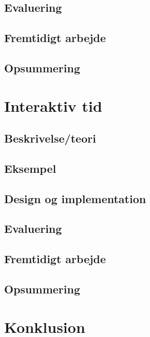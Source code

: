   \section{Evaluering}
  \section{Fremtidigt arbejde}
  \section{Opsummering}
\chapter{Interaktiv tid}
  \section{Beskrivelse/teori}
  \section{Eksempel}
  \section{Design og implementation}
  \section{Evaluering}
  \section{Fremtidigt arbejde}
  \section{Opsummering}
\chapter{Konklusion}

\newpage
\backmatter


\linespread{1}
\printbibliography


